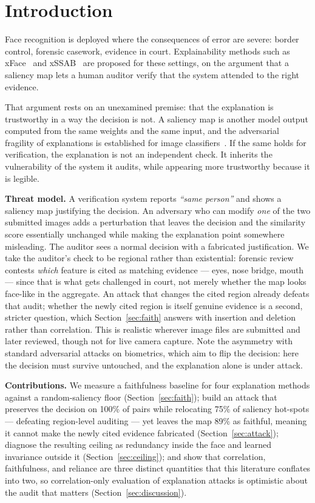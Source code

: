 \documentclass[conference,10pt]{IEEEtran}
\begin{document}
\section{Introduction}
\label{sec:intro}

Face recognition is deployed where the consequences of error are severe: border control,
forensic casework, evidence in court. Explainability methods such as
xFace~\cite{knoche2023xface} and xSSAB~\cite{huber2024xssab} are proposed for these settings,
on the argument that a saliency map lets a human auditor verify that the system attended to
the right evidence.

That argument rests on an unexamined premise: that the explanation is trustworthy in a way the
decision is not. A saliency map is another model output computed from the same weights and the
same input, and the adversarial fragility of explanations is established for image
classifiers~\cite{dombrowski2019explanations,heo2019fooling}. If the same holds for
verification, the explanation is not an independent check. It inherits the vulnerability of
the system it audits, while appearing more trustworthy because it is legible.

\textbf{Threat model.} A verification system reports \emph{``same person''} and shows a
saliency map justifying the decision. An adversary who can modify \emph{one} of the two
submitted images adds a perturbation that leaves the decision and the similarity score
essentially unchanged while making the explanation point somewhere misleading. The auditor
sees a normal decision with a fabricated justification. We take the auditor's check to be
regional rather than existential: forensic review contests \emph{which} feature is cited as
matching evidence — eyes, nose bridge, mouth — since that is what gets challenged in court, not
merely whether the map looks face-like in the aggregate. An attack that changes the cited
region already defeats that audit; whether the newly cited region is itself genuine evidence is
a second, stricter question, which Section~\ref{sec:faith} answers with insertion and deletion
rather than correlation. This is realistic wherever image files are submitted and later
reviewed, though not for live camera capture. Note the asymmetry with standard adversarial
attacks on biometrics, which aim to flip the decision: here the decision must survive untouched,
and the explanation alone is under attack.

\textbf{Contributions.} We measure a faithfulness baseline for four explanation methods
against a random-saliency floor (Section~\ref{sec:faith}); build an attack that preserves the
decision on 100\% of pairs while relocating 75\% of saliency hot-spots — defeating region-level
auditing — yet leaves the map 89\% as faithful, meaning it cannot make the newly cited evidence
fabricated (Section~\ref{sec:attack}); diagnose the resulting ceiling as redundancy inside the
face and learned invariance outside it (Section~\ref{sec:ceiling}); and show that correlation,
faithfulness, and reliance are three distinct quantities that this literature conflates into
two, so correlation-only evaluation of explanation attacks is optimistic about the audit that
matters (Section~\ref{sec:discussion}).
\end{document}
